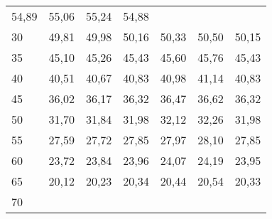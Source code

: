 \begin{tabular}{lllllll}
  \multicolumn{1}{r}{54,89} &
  \multicolumn{1}{r}{55,06} &
  \multicolumn{1}{r}{55,24} &
  \multicolumn{1}{r}{54,88} \\
\multicolumn{1}{l}{\hspace{1em}30} &
  \multicolumn{1}{|r}{49,81} &
  \multicolumn{1}{r}{49,98} &
  \multicolumn{1}{r}{50,16} &
  \multicolumn{1}{r}{50,33} &
  \multicolumn{1}{r}{50,50} &
  \multicolumn{1}{r}{50,15} \\
\multicolumn{1}{l}{\hspace{1em}35} &
  \multicolumn{1}{|r}{45,10} &
  \multicolumn{1}{r}{45,26} &
  \multicolumn{1}{r}{45,43} &
  \multicolumn{1}{r}{45,60} &
  \multicolumn{1}{r}{45,76} &
  \multicolumn{1}{r}{45,43} \\
\multicolumn{1}{l}{\hspace{1em}40} &
  \multicolumn{1}{|r}{40,51} &
  \multicolumn{1}{r}{40,67} &
  \multicolumn{1}{r}{40,83} &
  \multicolumn{1}{r}{40,98} &
  \multicolumn{1}{r}{41,14} &
  \multicolumn{1}{r}{40,83} \\
\multicolumn{1}{l}{\hspace{1em}45} &
  \multicolumn{1}{|r}{36,02} &
  \multicolumn{1}{r}{36,17} &
  \multicolumn{1}{r}{36,32} &
  \multicolumn{1}{r}{36,47} &
  \multicolumn{1}{r}{36,62} &
  \multicolumn{1}{r}{36,32} \\
\multicolumn{1}{l}{\hspace{1em}50} &
  \multicolumn{1}{|r}{31,70} &
  \multicolumn{1}{r}{31,84} &
  \multicolumn{1}{r}{31,98} &
  \multicolumn{1}{r}{32,12} &
  \multicolumn{1}{r}{32,26} &
  \multicolumn{1}{r}{31,98} \\
\multicolumn{1}{l}{\hspace{1em}55} &
  \multicolumn{1}{|r}{27,59} &
  \multicolumn{1}{r}{27,72} &
  \multicolumn{1}{r}{27,85} &
  \multicolumn{1}{r}{27,97} &
  \multicolumn{1}{r}{28,10} &
  \multicolumn{1}{r}{27,85} \\
\multicolumn{1}{l}{\hspace{1em}60} &
  \multicolumn{1}{|r}{23,72} &
  \multicolumn{1}{r}{23,84} &
  \multicolumn{1}{r}{23,96} &
  \multicolumn{1}{r}{24,07} &
  \multicolumn{1}{r}{24,19} &
  \multicolumn{1}{r}{23,95} \\
\multicolumn{1}{l}{\hspace{1em}65} &
  \multicolumn{1}{|r}{20,12} &
  \multicolumn{1}{r}{20,23} &
  \multicolumn{1}{r}{20,34} &
  \multicolumn{1}{r}{20,44} &
  \multicolumn{1}{r}{20,54} &
  \multicolumn{1}{r}{20,33} \\
\multicolumn{1}{l}{\hspace{1em}70} &

\end{tabular}
